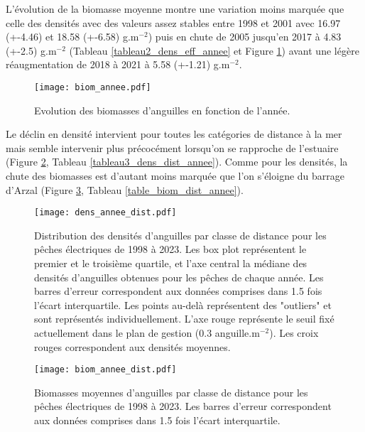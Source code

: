 \documentclass[10pt,twocolumn,titlepage,twoside]{article}\usepackage[]{graphicx}\usepackage[]{color}
\begin{document}
L'évolution de la biomasse moyenne montre une variation moins marquée que celle
des densités avec des valeurs assez stables entre 1998 et 2001 avec 
16.97 (+-4.46) et
18.58 (+-6.58) g.m$^{-2}$) puis en chute de 2005 jusqu'en 2017
à 4.83  (+-2.5) g.m$^{-2}$ (Tableau \ref{tableau2_dens_eff_annee}
et Figure \ref{biom_annee}) avant une légère réaugmentation de 2018 à 2021 à
5.58  (+-1.21) g.m$^{-2}$.


\begin{figure}[htbp]
\centering
 \texttt{[image: biom\_annee.pdf]} 
\caption[Biomasses d'anguilles.]{Evolution des biomasses d'anguilles en fonction
de l'année.}
\label{biom_annee}
\end{figure}

Le déclin en densité intervient pour toutes les catégories de distance à la mer 
mais semble intervenir plus précocément
lorsqu'on se rapproche de l'estuaire (Figure \ref{dens_annee_distance},
Tableau \ref{tableau3_dens_dist_annee}).
Comme pour les densités, la chute des biomasses est
d'autant moins marquée que l'on s'éloigne du barrage d'Arzal (Figure
\ref{biom_annee_dist}, Tableau \ref{table_biom_dist_annee}).

\begin{figure}[htbp]
  \centering
    \texttt{[image: dens\_annee\_dist.pdf]}
    \caption[Densité moyennes $\sim$ distance.]{Distribution des densités
    d'anguilles par classe de distance pour les pêches
    électriques de 1998 à 2023. Les box plot représentent le premier
    et le troisième quartile, et l'axe central la médiane des densités
    d'anguilles obtenues pour les pêches de chaque année. Les barres d'erreur correspondent aux données comprises dans 1.5 fois l'écart
    interquartile. Les points au-delà représentent des "outliers" et sont
    représentés individuellement. L'axe rouge représente le seuil fixé
    actuellement dans le plan de gestion (0.3 anguille.m$^{-2}$).
     Les croix rouges correspondent aux densités
    moyennes.}
  \label{dens_annee_distance}
\end{figure} 
    
\small

\normalsize

\begin{figure}[htbp]
  \centering
  \texttt{[image: biom\_annee\_dist.pdf]}
  \caption[_court]{Biomasses moyennes d'anguilles par classe de distance pour les pêches
  électriques de 1998 à 2023. Les barres d'erreur
  correspondent aux données comprises dans 1.5 fois
  l'écart interquartile.}
  \label{biom_annee_dist}
\end{figure}
\end{document}
